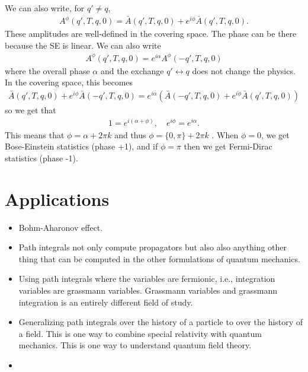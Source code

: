 \documentclass{book}
\theoremstyle{definition}
\newcommand{\al}{\alpha}
\newcommand{\lp}{\left(}
\newcommand{\rp}{\right)}
\begin{document}
We can also write, for $q'\neq q$,
\begin{align}
A^{\phi}(q',T,q,0) = \bar{A}(q',T,q,0) + e^{i\phi}\bar{A}(q',T,q,0). 
\end{align}
These amplitudes are well-defined in the covering space. The phase can be there because the SE is linear. We can also write
\begin{align}
A^{\phi}(q',T,q,0) = e^{i\al}A^\phi(-q',T,q,0) 
\end{align}
where the overall phase $\al$ and the exchange $q' \leftrightarrow q$ does not change the physics. In the covering space, this becomes
\begin{align}
\bar{A}(q',T,q,0) + e^{i\phi}\bar{A}(-q',T,q,0) = e^{i\al}\lp \bar{A}(-q',T,q,0) + e^{i\phi}\bar{A}(q',T,q,0) \rp
\end{align}
so we get that
\begin{align}
1 = e^{i(\al + \phi)}, \quad e^{i\phi} = e^{i\al}.
\end{align}
This means that $\phi = \al + 2\pi k$ and thus $\phi = \{ 0,\pi \} + 2\pi k$ . When $\phi = 0$, we get Bose-Einstein statistics (phase +1), and if $\phi = \pi$ then we get Fermi-Dirac statistics (phase -1).  




\newpage



\section{Applications}

\begin{itemize}
	\item Bohm-Aharonov effect.
	\item Path integrals not only compute propagators but also also anything other thing that can be computed in the other formulations of quantum mechanics. 
	\item Using path integrals where the variables are fermionic, i.e., integration variables are grassmann variables. Grassmann variables and grassmann integration is an entirely different field of study.
	\item Generalizing path integrals over the history of a particle to over the history of a field. This is one way to combine special relativity with quantum mechanics. This is one way to understand quantum field theory. 
	\item 
\end{itemize}
\end{document}
